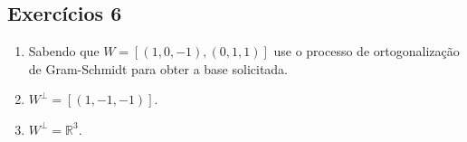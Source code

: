 \subsection{Exercícios 6}

\begin{enumerate}
  \item Sabendo que $W=[(1,0,-1), (0, 1,1)]$ use o processo de ortogonalização de Gram-Schmidt para obter a base solicitada.
  \item $W^{\perp}=[(1,-1,-1)]$.
  \item $W^{\perp}=\mathbb{R}^3$.
\end{enumerate}
